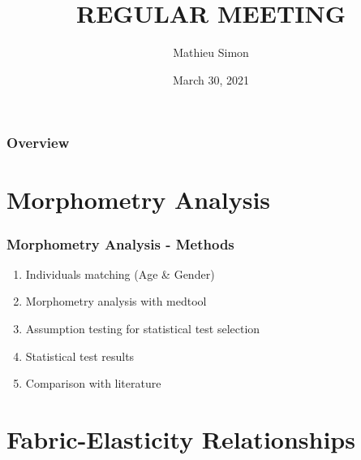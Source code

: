 \documentclass[xcolor=table]{beamer}
\title[Regular Meeting]{
\uppercase{Regular Meeting}
}
\author{Mathieu Simon}
\institute[University of Bern]
{
MSc - Biomedical Engineering \\
University of Bern, Faculty of Medicine \\
\medskip
}
\date{March 30, 2021}
\begin{document}
\begin{frame}
\titlepage
\end{frame}


\begin{frame}
	\frametitle{Overview}
	\tableofcontents
\end{frame}


\section{Morphometry Analysis}

\begin{frame}
	\frametitle{Morphometry Analysis - Methods}
	\begin{enumerate}
		\item Individuals matching (Age \& Gender)
		\item Morphometry analysis with medtool
		\item Assumption testing for statistical test selection
		\item Statistical test results
		\item Comparison with literature
	\end{enumerate}
\end{frame}



\section{Fabric-Elasticity Relationships}
\end{document}
